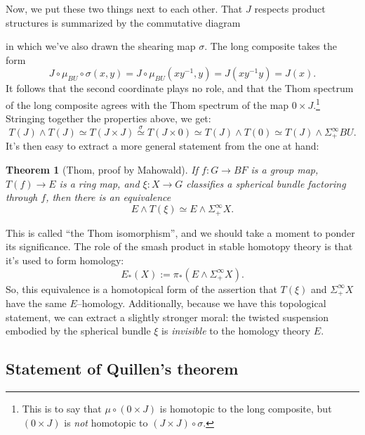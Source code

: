 \documentclass{amsart}
\newcommand{\<}{\langle}
\renewcommand{\>}{\rangle}
\newcommand{\sm}{\wedge}
\newcommand{\Susp}{\Sigma}
\theoremstyle{plain}
\newtheorem*{theorem}{Theorem}
\theoremstyle{definition}
\theoremstyle{remark}
\begin{document}
Now, we put these two things next to each other.  That $J$ respects product structures is summarized by the commutative diagram
\begin{center}
\end{center}
in which we've also drawn the shearing map $\sigma$.  The long composite takes the form \[J \circ \mu_{BU} \circ \sigma (x, y) = J \circ \mu_{BU} (x y^{-1}, y) = J(x y^{-1} y) = J(x).\]  It follows that the second coordinate plays no role, and that the Thom spectrum of the long composite agrees with the Thom spectrum of the map $0 \times J$.\footnote{This is to say that $\mu \circ (0 \times J)$ is homotopic to the long composite, but $(0 \times J)$ is \emph{not} homotopic to $(J \times J) \circ \sigma$.}  Stringing together the properties above, we get: \[T(J) \sm T(J) \simeq T(J \times J) \stackrel{\sigma}{\simeq} T(J \times 0) \simeq T(J) \sm T(0) \simeq T(J) \sm \Susp^\infty_+ BU.\]  It's then easy to extract a more general statement from the one at hand:
\begin{theorem}[Thom, proof by Mahowald]
If $f: G \to BF$ is a group map, $T(f) \to E$ is a ring map, and $\xi: X \to G$ classifies a spherical bundle factoring through $f$, then there is an equivalence \[E \sm T(\xi) \simeq E \sm \Susp^\infty_+ X.\]
\end{theorem}

This is called ``the Thom isomorphism'', and we should take a moment to ponder its significance.  The role of the smash product in stable homotopy theory is that it's used to form homology: \[E_*(X) := \pi_*(E \sm \Susp^\infty_+ X).\]  So, this equivalence is a homotopical form of the assertion that $T(\xi)$ and $\Susp^\infty_+ X$ have the same $E$--homology.  Additionally, because we have this topological statement, we can extract a slightly stronger moral: the twisted suspension embodied by the spherical bundle $\xi$ is \emph{invisible} to the homology theory $E$.



\subsection{Statement of Quillen's theorem}
\end{document}
